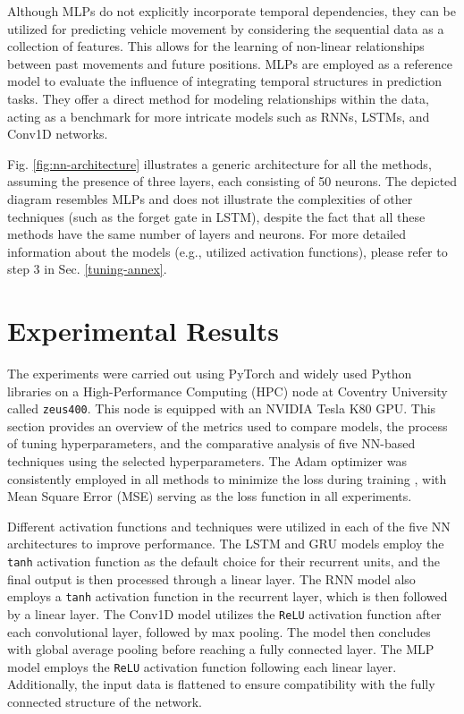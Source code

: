 \documentclass[journal,onecolumn]{IEEEtran}
\begin{document}
{Although MLPs do not explicitly incorporate temporal dependencies, they can be utilized for predicting vehicle movement by considering the sequential data as a collection of features. This allows for the learning of non-linear relationships between past movements and future positions. MLPs are employed as a reference model to evaluate the influence of integrating temporal structures in prediction tasks. They offer a direct method for modeling relationships within the data, acting as a benchmark for more intricate models such as RNNs, LSTMs, and Conv1D networks.

Fig. \ref{fig:nn-architecture} illustrates a generic architecture for all the methods, assuming the presence of three layers, each consisting of 50 neurons. The depicted diagram resembles MLPs and does not illustrate the complexities of other techniques (such as the forget gate in LSTM), despite the fact that all these methods have the same number of layers and neurons. For more detailed information about the models (e.g., utilized activation functions), please refer to step 3 in Sec. \ref{tuning-annex}.

\section{Experimental Results} \label{results}
The experiments were carried out using PyTorch and widely used Python libraries on a High-Performance Computing (HPC) node at Coventry University called \texttt{zeus400}. This node is equipped with an NVIDIA Tesla K80 GPU. This section provides an overview of the metrics used to compare models, the process of tuning hyperparameters, and the comparative analysis of five NN-based techniques using the selected hyperparameters. The Adam optimizer was consistently employed in all methods to minimize the loss during training \cite{KingBa15}, with Mean Square Error (MSE) serving as the loss function in all experiments.

Different activation functions and techniques were utilized in each of the five NN architectures to improve performance. The LSTM and GRU models employ the \texttt{tanh} activation function as the default choice for their recurrent units, and the final output is then processed through a linear layer. The RNN model also employs a \texttt{tanh} activation function in the recurrent layer, which is then followed by a linear layer. The Conv1D model utilizes the \texttt{ReLU} activation function after each convolutional layer, followed by max pooling. The model then concludes with global average pooling before reaching a fully connected layer. The MLP model employs the \texttt{ReLU} activation function following each linear layer. Additionally, the input data is flattened to ensure compatibility with the fully connected structure of the network.


}
\end{document}
